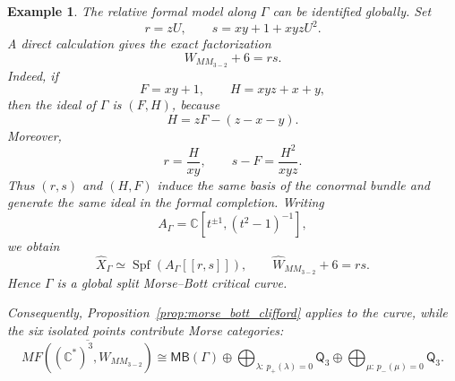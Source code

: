 \documentclass[11pt]{amsart}
\newtheorem{example}{Example}[section]
\newcommand{\MorseCat}[1]{\mathsf{Q}_{#1}}
\newcommand{\MBcat}[1]{\mathsf{MB}(#1)}
\begin{document}
\begin{example}
The relative formal model along $\Gamma$ can be identified globally. Set
\[
r=zU,
\qquad
s=xy+1+xyzU^2.
\]
A direct calculation gives the exact factorization
\[
W_{MM_{3-2}}+6=rs.
\]
Indeed, if
\[
F=xy+1,
\qquad
H=xyz+x+y,
\]
then the ideal of $\Gamma$ is $(F,H)$, because
\[
H=zF-(z-x-y).
\]
Moreover,
\[
r=\frac{H}{xy},
\qquad
s-F=\frac{H^2}{xyz}.
\]
Thus $(r,s)$ and $(H,F)$ induce the same basis of the conormal bundle and
generate the same ideal in the formal completion. Writing
\[
A_{\Gamma}=\mathbb C[t^{\pm1},(t^2-1)^{-1}],
\]
we obtain
\[
\widehat X_{\Gamma}
\simeq
\operatorname{Spf}\!\left(A_{\Gamma}[[r,s]]\right),
\qquad
\widehat W_{MM_{3-2}}+6=rs.
\]
Hence $\Gamma$ is a global split Morse--Bott critical curve.

Consequently, Proposition~\ref{prop:morse_bott_clifford} applies to the curve,
while the six isolated points contribute Morse categories:
\[
\overline{MF((\mathbb{C}^*)^3,W_{MM_{3-2}})}
\cong \MBcat{\Gamma} \oplus\bigoplus_{\lambda:\,p_+(\lambda)=0}\MorseCat{3} \oplus\bigoplus_{\mu:\,p_-(\mu)=0}\MorseCat{3}.
\]
\end{example}
\end{document}
